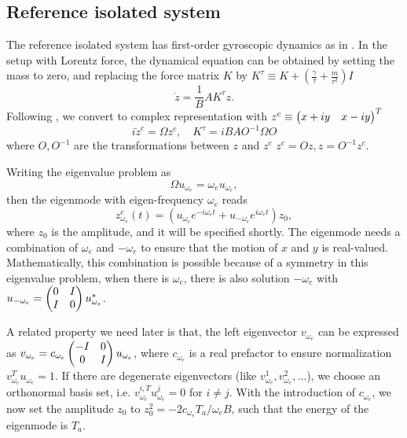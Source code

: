 \documentclass[
 amsmath,amssymb,
 aps,
 pre,
 longbibliography,
 10pt, onecolumn,
 notitlepage
]{revtex4-1}
\begin{document}
\subsection{Reference isolated system}
The reference isolated system has first-order gyroscopic dynamics as in \cite{Nash2015TopologicalMechanics}. In the setup with Lorentz force, the dynamical equation can be obtained by setting the mass to zero, and replacing the force matrix $K$ by $K^\tau \equiv K + (\frac{\gamma}{\tau} + \frac{m}{\tau^2})I$
\begin{equation}
    \dot{z} = \frac{1}{B} A K^\tau z.
\end{equation}
Following \cite{Nash2015TopologicalMechanics}, we convert to complex representation with $z^c \equiv \pmqty{x + iy & x - iy}^T$
\begin{equation}
i \dot{z}^c = \Omega z^c,\quad
K^\tau = i B A O^{-1} \Omega O
\end{equation}
where $O,O^{-1}$ are the transformations between $z$ and $z^c$ $z^c = Oz, z = O^{-1}z^c$.

Writing the eigenvalue problem as
\begin{equation}
\Omega u_{\omega_e} = \omega_e u_{\omega_e} ,
\end{equation}
then the eigenmode with eigen-frequency $\omega_e$ reads
\begin{equation} \label{eqnS:mode_zct}
z^c_{\omega_e}(t) =  (u_{\omega_e} e^{-i\omega_e t} + u_{-\omega_e} e^{i\omega_e t})z_0 ,
\end{equation}
where $z_0$ is the amplitude, and it will be specified shortly.
The eigenmode needs a combination of $\omega_e$ and $-\omega_e$ to ensure that the motion of $x$ and $y$ is real-valued.
Mathematically, this combination is possible because of a symmetry in this eigenvalue problem, when there is $\omega_e$, there is also solution $-\omega_e$ with $u_{-\omega_e} = \pmqty{ 0 & I \\ I & 0 } u_{\omega_e}^*$.

A related property we need later is that, the left eigenvector $v_{\omega_e}$ can be expressed as $v_{\omega_e} = c_{\omega_e} \pmqty{ -I & 0 \\ 0 & I } u_{\omega_e}$,
where $c_{\omega_e}$ is a real prefactor to ensure normalization $v_{\omega_e}^T u_{\omega_e} = 1$.
If there are degenerate eigenvectors (like $v_{\omega_e}^{1},v_{\omega_e}^{2},\dots$), we choose an orthonormal basis set, i.e. $v_{\omega_e}^{i,T} u_{\omega_e}^{j} = 0$ for $i \neq j$.
With the introduction of $c_{\omega_e}$, we now set the amplitude $z_0$ to
$z_0^2 = -2 c_{\omega_e} T_a / \omega_e B$, such that the energy of the eigenmode is $T_a$.
\end{document}
